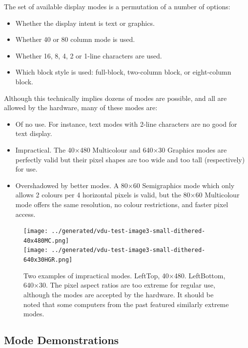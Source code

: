 The set of available display modes is a permutation of a number of options:

\begin{itemize}
  \item Whether the display intent is text or graphics.
  \item Whether 40 or 80 column mode is used.
  \item Whether 16, 8, 4, 2 or 1-line characters are used.
  \item Which block style is used: full-block, two-column block, or eight-column block.
\end{itemize}

Although this technically implies dozens of modes are possible, and all are
allowed by the hardware, many of these modes are:

\begin{itemize}
\item Of no use. For instance, text modes with 2-line characters are no good for text display.
\item Impractical. The 40×480 Multicolour and 640×30 Graphics modes are
  perfectly valid but their pixel shapes are too wide and too tall (respectively) for use.
\item Overshadowed by better modes. A 80×60 Semigraphics mode which only
  allows 2 colours per 4 horizontal pixels is valid, but the 80×60
  Multicolour mode offers the same resolution, no colour restrictions, and
  faster pixel access.
\end{itemize}

\begin{figure}
  \centering
  \texttt{[image: ../generated/vdu-test-image3-small-dithered-40x480MC.png]}
  \ifxetex
    \hfill
  \else
    \vspace{1em}\\
  \fi
  \texttt{[image: ../generated/vdu-test-image3-small-dithered-640x30HGR.png]}%
  \caption[Two examples of impractical
    modes]{\label{fig:vdu:impractical-modes}Two examples of impractical
    modes. \ifxetex Left\else Top\fi, 40×480. \ifxetex Left\else Bottom\fi, 640×30.
    The pixel aspect ratios are too extreme
    for regular use, although the modes are accepted by the hardware. It should
    be noted that some computers from the past featured similarly extreme
    modes.}
\end{figure}


\subsection{Mode Demonstrations}

